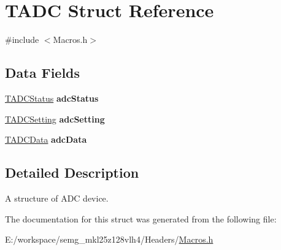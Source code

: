 \hypertarget{struct_t_a_d_c}{\section{T\-A\-D\-C Struct Reference}
\label{struct_t_a_d_c}
}


{\ttfamily \#include $<$Macros.\-h$>$}

\subsection*{Data Fields}
\begin{DoxyCompactItemize}
\item 
\hypertarget{struct_t_a_d_c_ac56c34bc297b311769161b503e1ae94b}{\hyperlink{struct_t_a_d_c_status}{T\-A\-D\-C\-Status} {\bfseries adc\-Status}}\label{struct_t_a_d_c_ac56c34bc297b311769161b503e1ae94b}

\item 
\hypertarget{struct_t_a_d_c_aaae89d22ee611a30b3cd4f371fbaa25a}{\hyperlink{struct_t_a_d_c_setting}{T\-A\-D\-C\-Setting} {\bfseries adc\-Setting}}\label{struct_t_a_d_c_aaae89d22ee611a30b3cd4f371fbaa25a}

\item 
\hypertarget{struct_t_a_d_c_ac292bd1bd319528862aa3df24c99ad00}{\hyperlink{struct_t_a_d_c_data}{T\-A\-D\-C\-Data} {\bfseries adc\-Data}}\label{struct_t_a_d_c_ac292bd1bd319528862aa3df24c99ad00}

\end{DoxyCompactItemize}


\subsection{Detailed Description}
A structure of A\-D\-C device. 

The documentation for this struct was generated from the following file\-:\begin{DoxyCompactItemize}
\item 
E\-:/workspace/semg\-\_\-mkl25z128vlh4/\-Headers/\hyperlink{_macros_8h}{Macros.\-h}\end{DoxyCompactItemize}
